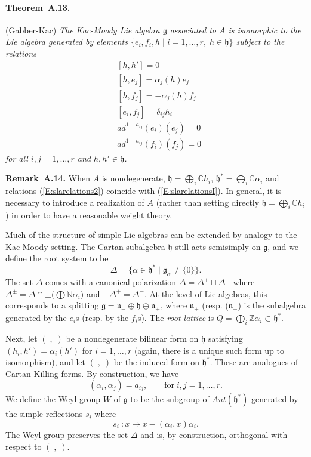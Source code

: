 \documentclass[a4paper,10pt]{amsart}
\def\Z{\mathbb{Z}}
\def\N{\mathbb{N}}
\def\a{\alpha}
\def\C{\mathbb{C}}
\def\g{\mathfrak{g}}
\def\h{\mathfrak{h}}
\def\n{\mathfrak{n}}
\numberwithin{equation}{section}
\begin{document}
{\paragraph{\textbf{Theorem~A.13.}}(Gabber-Kac) \textit{The Kac-Moody Lie algebra $\g$ associated to $A$ is isomorphic to the Lie algebra generated by elements $\{e_i, f_i, h\;|\; i=1, \ldots , r, \; h \in \h\}$ subject to the relations
\begin{equation}\label{E:SerrerelGK}
\begin{split}
&[h,h']=0  \\
&[h, e_j]=\a_{j}(h) e_j  \\
&[h, f_j]=-\a_{j}(h) f_j \\
&[e_i,f_j]= \delta_{ij} h_i\\
&ad^{1-a_{ij}}(e_i)(e_j)=0  \\
&ad^{1-a_{ij}}(f_i)(f_j)=0
\end{split}
\end{equation}
for all $i,j=1, \ldots, r$ and $h,h' \in \h$.}

\vspace{.15in}

\noindent
\textbf{Remark~A.14.} When $A$ is nondegenerate, $\h=\bigoplus_i \C h_i$, $\h^*=\bigoplus_i \C \a_i$ and relations (\ref{E:slarelations2}) coincide with (\ref{E:slarelationsI}). In general, it is necessary to introduce a realization of $A$ (rather than setting directly $\h=\bigoplus_i \C h_i$) in order to have a reasonable weight theory.

\vspace{.15in}

Much of the structure of simple Lie algebras can be extended by analogy to the Kac-Moody setting.
The Cartan subalgebra $\h$ still acts semisimply on $\g$, and we define the root system to be
$$\Delta=\{\alpha \in \h^*\;|\; \g_\a \neq \{0\}\}.$$
The set $\Delta$ comes with a canonical polarization $\Delta=\Delta^+ \sqcup
\Delta^-$ where $\Delta^{\pm}=\Delta \cap \pm \big( \bigoplus\N \a_i \big)$ and $-\Delta^+=\Delta^-$. At the level of Lie algebras, this corresponds to a splitting $\g=\n_- \oplus \h \oplus \n_+$, where $\n_{+}$ (resp. ($\n_-$) is the subalgebra generated by the $e_i$s (resp. by the $f_i$s). The \textit{root lattice} is $Q=\bigoplus_i \Z \a_i \subset \h^*$.

\vspace{.1in}

Next, let $(\;,\;)$ be a nondegenerate bilinear form on $\h$ satisfying
$( h_i, h')=\a_{i}(h')$ for $i=1, \ldots , r$ (again, there is a unique such form up to isomorphism), and let $(\;,\;)$ be the induced form on $\h^*$. These are analogues of Cartan-Killing forms. By construction, we have
$$(\a_i,\a_j)=a_{ij}, \qquad \text{for}\; i, j=1, \ldots, r.$$
We define the Weyl group $W$ of $\g$ to be the subgroup of ${Aut}(\h^*)$ generated by the simple reflections $s_i$ where
$$s_i~: x \mapsto x-( \a_i,x ) \a_i.$$
The Weyl group preserves the set $\Delta$ and is, by construction, orthogonal with respect to $(\;,\;)$.

}
\end{document}
